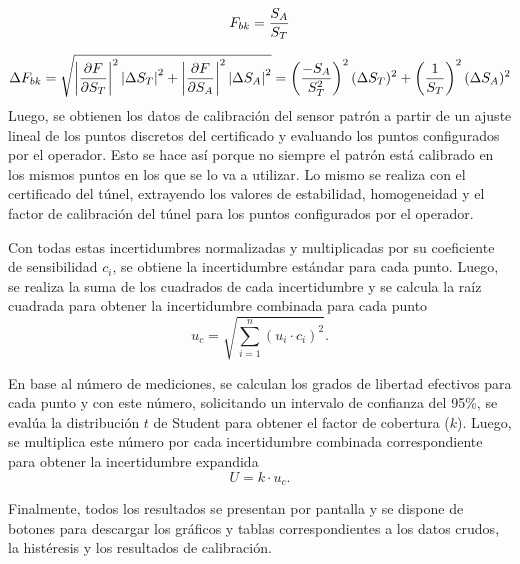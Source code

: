 \begin{equation}
    \centering
    F_{bk}= \frac{S_{A} }{S_{T}}
    \label{eq:FactorDeBloqueo}
\end{equation}

\begin{equation}
    \centering
    \Delta F_{bk} =  \sqrt{\left\lvert \frac{\partial F}{\partial S_T} \right\rvert^2 \left\lvert\Delta S_T\right\rvert^2 + \left\lvert \frac{\partial F}{\partial S_A} \right\rvert^2 \left\lvert\Delta S_A\right\rvert^2} = \left( \frac{-S_{A}}{S_{T}^{2}} \right)^2 (\Delta S_T)^2 + \left( \frac{1}{S_{T}} \right)^2 (\Delta S_A)^2
    \label{eq:incertiFactorBloqueo}
\end{equation}
Luego, se obtienen los datos de calibración del sensor patrón a partir de un ajuste lineal de los puntos discretos del certificado y evaluando los puntos configurados por el operador. Esto se hace así porque no siempre el patrón está calibrado en los mismos puntos en los que se lo va a utilizar. Lo mismo se realiza con el certificado del túnel, extrayendo los valores de estabilidad, homogeneidad y el factor de calibración del túnel para los puntos configurados por el operador.

Con todas estas incertidumbres normalizadas y multiplicadas por su coeficiente de sensibilidad $c_{i}$, se obtiene la incertidumbre estándar para cada punto. Luego, se realiza la suma de los cuadrados de cada incertidumbre y se calcula la raíz cuadrada para obtener la incertidumbre combinada para cada punto
\[
u_c = \sqrt{\sum_{i=1}^{n} (u_{i} \cdot c_{i})^2}.
\]

En base al número de mediciones, se calculan los grados de libertad efectivos para cada punto y con este número, solicitando un intervalo de confianza del 95\%, se evalúa la distribución $t$ de Student para obtener el factor de cobertura ($k$). Luego, se multiplica este número por cada incertidumbre combinada correspondiente para obtener la incertidumbre expandida 
\[
U = k \cdot u_c.
\]

Finalmente, todos los resultados se presentan por pantalla y se dispone de botones para descargar los gráficos y tablas correspondientes a los datos crudos, la histéresis y los resultados de calibración.


